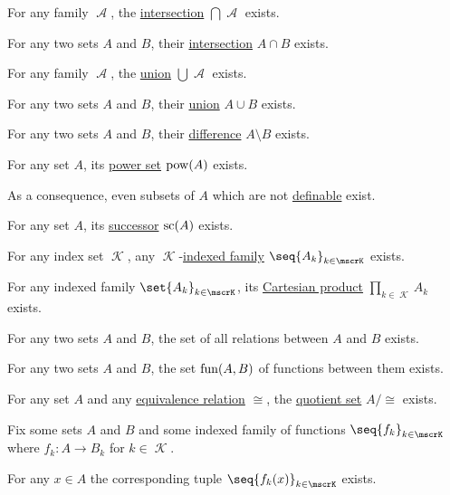 \begin{proposition}
\begin{thmenum}
     For any  family \( \mscrA \), the \hyperref[def:basic_set_operations/intersection]{intersection} \( \bigcap \mscrA \) exists.

     For any two sets \( A \) and \( B \), their \hyperref[def:basic_set_operations/intersection]{intersection} \( A \cap B \) exists.

     For any family \( \mscrA \), the \hyperref[def:basic_set_operations/union]{union} \( \bigcup \mscrA \) exists.

     For any two sets \( A \) and \( B \), their \hyperref[def:basic_set_operations/union]{union} \( A \cup B \) exists.

     For any two sets \( A \) and \( B \), their \hyperref[def:basic_set_operations/difference]{difference} \( A \setminus B \) exists.

     For any set \( A \), its \hyperref[def:basic_set_operations/power_set]{power set} \( \operatorname{pow}(A) \) exists.

    As a consequence, even subsets of \( A \) which are not \hyperref[def:first_order_definability]{definable} exist.

     For any set \( A \), its \hyperref[def:ordinal_successor]{successor} \( \op{sc}(A) \) exists.

     For any index set \( \mscrK \), any \( \mscrK \)-\hyperref[def:indexed_family]{indexed family} \( \seq{ A_k }_{k \in \mscrK} \) exists.

     For any indexed family \( \set{ A_k }_{k \in \mscrK} \), its \hyperref[def:cartesian_product]{Cartesian product} \( \prod_{k \in \mscrK} A_k \) exists.

     For any two sets \( A \) and \( B \), the set of all relations between \( A \) and \( B \) exists.

     For any two sets \( A \) and \( B \), the set \hyperref[def:set_of_all_functions]{\( \operatorname{fun}(A, B) \)} of functions between them exists.

     For any set \( A \) and any \hyperref[def:equivalence_relation]{equivalence relation} \( \cong \), the \hyperref[def:equivalence_relation/quotient]{quotient set} \( A / {\cong} \) exists.

     Fix some sets \( A \) and \( B \) and some indexed family of functions \( \seq{ f_k }_{k \in \mscrK} \) where \( f_k: A \to B_k \) for \( k \in \mscrK \).

    For any \( x \in A \) the corresponding tuple \( \seq{ f_k(x) }_{k \in \mscrK} \) exists.
  \end{thmenum}
\end{proposition}
